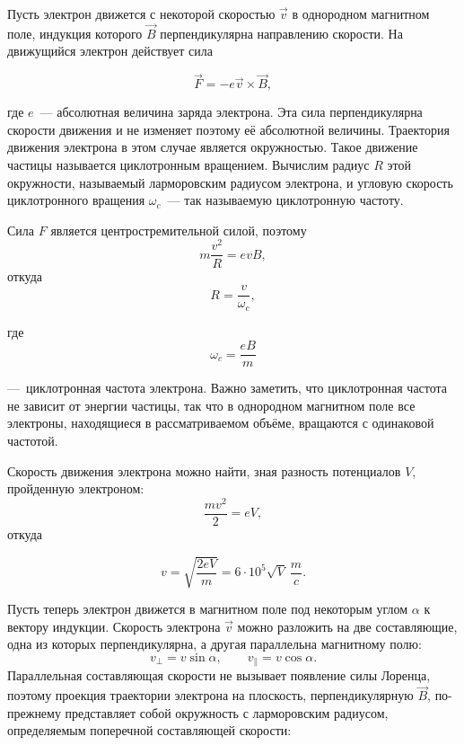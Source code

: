 Пусть электрон движется с некоторой скоростью $\vec{v}$ в однородном магнитном поле, индукция которого $\vec{B}$
перпендикулярна направлению скорости. На движущийся электрон действует сила %

\begin{equation}
\vec{F}=-e{\vec{v}}\times{\vec{B}},
\label{3LorenzForce}
\end{equation}

где $e$~--- абсолютная величина заряда электрона. Эта сила перпендикулярна скорости движения и не изменяет поэтому её абсолютной величины. Траектория движения электрона в этом случае является окружностью. Такое движение частицы называется циклотронным вращением. Вычислим радиус $R$ этой окружности, называемый \textsf{ларморовским радиусом} электрона, и угловую скорость циклотронного вращения $\omega_c$~--- так называемую \textsf{циклотронную частоту}.

Сила $F$ является центростремительной силой, поэтому
$$
m\frac{v^2}{R}=evB,
$$
откуда
\begin{equation}
 R=\frac{v}{\omega_c},
\label{3LarmorRadius}
\end{equation}

где
\begin{equation}
\omega_c=\frac{eB}{m}
\label{3CyclotronFreq}
\end {equation}

---~циклотронная частота электрона. Важно заметить, что циклотронная частота не зависит от энергии частицы, так что в однородном магнитном поле все электроны, находящиеся в рассматриваемом объёме, вращаются с одинаковой частотой.


Скорость движения электрона можно найти, зная разность потенциалов $V$, пройденную электроном:
$$
\frac{mv^2}{2}=eV,
$$
откуда

\begin{equation}
v=\sqrt{\frac{2eV}{m}} = 6\cdot10^5\sqrt{V}~\frac{m}{c}.
\label{3VoltageVelocity}
\end{equation}

Пусть теперь электрон движется в магнитном поле под некоторым углом $\alpha$ к вектору индукции. Скорость электрона
$\vec{v}$ можно разложить на две составляющие, одна из которых перпендикулярна, а другая параллельна магнитному полю:
$$
v_{\bot}=v\sin\alpha,\qquad v_{\parallel}=v\cos\alpha.
$$
Параллельная составляющая скорости не вызывает появление силы Лоренца, поэтому проекция траектории электрона на
плоскость, перпендикулярную $\vec{B}$, по-прежнему представляет собой окружность с ларморовским радиусом, определяемым поперечной составляющей скорости:

